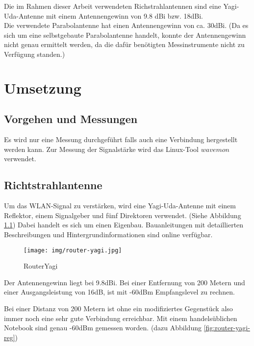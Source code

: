 \documentclass[oneside,11pt,parskip=half,ngerman]{scrreprt}
\makeatletter
\def\maxwidth{\ifdim\Gin@nat@width>\linewidth\linewidth
\else\Gin@nat@width\fi}
\let\Oldincludegraphics\includegraphics
\renewcommand{\includegraphics}[1]{\Oldincludegraphics[width=\maxwidth,height=20em,keepaspectratio]{#1}}
\makeatother
\begin{document}
Die im Rahmen dieser Arbeit verwendeten Richstrahlantennen sind eine
Yagi-Uda-Antenne mit einem Antennengewinn von 9.8 dBi bzw. 18dBi.\\

Die verwendete Parabolantenne hat einen Antennengewinn von ca. 30dBi.
(Da es sich um eine selbstgebaute Parabolantenne handelt, konnte der
Antennengewinn nicht genau ermittelt werden, da die dafür benötigten
Messinstrumente nicht zu Verfügung standen.)\\

\chapter{Umsetzung}\label{umsetzung}

\section{Vorgehen und Messungen}\label{vorgehen-und-messungen}

Es wird nur eine Messung durchgeführt falls auch eine Verbindung
hergestellt werden kann. Zur Messung der Signalstärke wird das
Linux-Tool \(wavemon\) verwendet.

\section{Richtstrahlantenne}\label{richtstrahlantenne-1}

Um das WLAN-Signal zu verstärken, wird eine Yagi-Uda-Antenne mit einem
Reflektor, einem Signalgeber und fünf Direktoren verwendet. (Siehe
Abbildung \ref{fig:routeryagi}) Dabei handelt es sich um einen Eigenbau.
Bauanleitungen mit detaillierten Beschreibungen und
Hintergrundinformationen sind online verfügbar. \autocite{eigenbauyagi}

\begin{figure}[htbp]
\centering
\texttt{[image: img/router-yagi.jpg]}
\caption{RouterYagi\label{fig:routeryagi}}
\end{figure}

Der Antennengewinn liegt bei 9.8dBi. Bei einer Entfernung von 200 Metern
und einer Ausgangsleistung von 16dB, ist mit -60dBm Empfangslevel zu
rechnen.

Bei einer Distanz von 200 Metern ist ohne ein modifiziertes Gegenstück
also immer noch eine sehr gute Verbindung erreichbar. Mit einem
handelsüblichen Notebook sind genau -60dBm gemessen worden. (dazu
Abbildung \ref{fig:router-yagi-reg})
\end{document}
